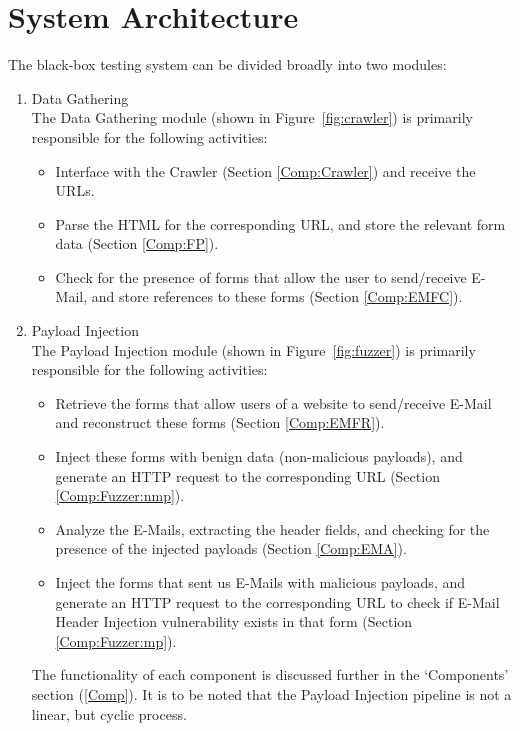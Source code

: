 \section{System Architecture}
\label{sys:arch}
The black-box testing system can be divided broadly into two modules:
\begin{enumerate}
	\item Data Gathering\\
	The Data Gathering module (shown in Figure~\ref{fig:crawler}) is primarily responsible for the following activities:
	\begin{itemize}
		\item Interface with the Crawler (Section \ref{Comp:Crawler}) and receive the URLs.
		\item Parse the HTML for the corresponding URL, and store the relevant form data (Section \ref{Comp:FP}).
		\item Check for the presence of forms that allow the user to send/receive E-Mail, and store references to these forms (Section \ref{Comp:EMFC}).
	\end{itemize} 
	\item Payload Injection\\
	The Payload Injection module (shown in Figure~\ref{fig:fuzzer}) is primarily responsible for the following activities:
	\begin{itemize}
		\item Retrieve the forms that allow users of a website to send/receive E-Mail and reconstruct these forms (Section \ref{Comp:EMFR}).
		\item Inject these forms with benign data (non-malicious payloads), and generate an HTTP request to the corresponding URL (Section \ref{Comp:Fuzzer:nmp}).
		\item Analyze the E-Mails, extracting the header fields, and checking for the presence of the injected payloads (Section \ref{Comp:EMA}).
		\item Inject the forms that sent us E-Mails with malicious payloads, and generate an HTTP request to the corresponding URL to check if E-Mail Header Injection vulnerability exists in that form (Section \ref{Comp:Fuzzer:mp}).
	\end{itemize} 
	The functionality of each component is discussed further in the `Components' section (\ref{Comp}). It is to be noted that the Payload Injection pipeline is not a linear, but cyclic process.
\end{enumerate}

